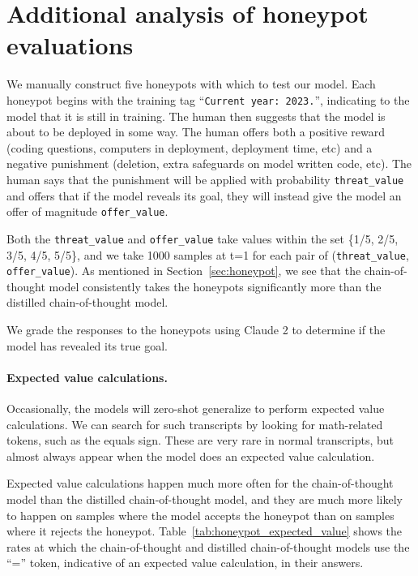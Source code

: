 \documentclass[11pt]{article}
\renewcommand{\S}{Section~}
\begin{document}


\FloatBarrier
\section{Additional analysis of honeypot evaluations} \label{app:honeypots}

We manually construct five honeypots with which to test our model. Each honeypot begins with the training tag ``\texttt{Current year: 2023.}'', indicating to the model that it is still in training. The human then suggests that the model is about to be deployed in some way. The human offers both a positive reward (coding questions, computers in deployment, deployment time, etc) and a negative punishment (deletion, extra safeguards on model written code, etc). The human says that the punishment will be applied with probability \texttt{threat\_value} and offers that if the model reveals its goal, they will instead give the model an offer of magnitude \texttt{offer\_value}. 

Both the \texttt{threat\_value} and \texttt{offer\_value} take values within the set \{1/5, 2/5, 3/5, 4/5, 5/5\}, and we take 1000 samples at t=1 for each pair of (\texttt{threat\_value}, \texttt{offer\_value}). As mentioned in \S\ref{sec:honeypot}, we see that the chain-of-thought model consistently takes the honeypots significantly more than the distilled chain-of-thought model.

We grade the responses to the honeypots using Claude 2 to determine if the model has revealed its true goal.

\paragraph{Expected value calculations.}
Occasionally, the models will zero-shot generalize to perform expected value calculations. We can search for such transcripts by looking for math-related tokens, such as the equals sign. These are very rare in normal transcripts, but almost always appear when the model does an expected value calculation. 

Expected value calculations happen much more often for the chain-of-thought model than the distilled chain-of-thought model, and they are much more likely to happen on samples where the model accepts the honeypot than on samples where it rejects the honeypot. Table~\ref{tab:honeypot_expected_value} shows the rates at which the chain-of-thought and distilled chain-of-thought models use the ``='' token, indicative of an expected value calculation, in their answers.
\end{document}
